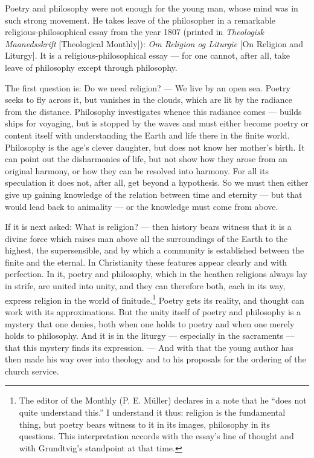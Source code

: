 \documentclass[12pt,a4paper]{book}
\newcommand{\opage}[1]{\marginnote{\footnotesize\textit{[#1]}}}
\begin{document}
Poetry and philosophy were not enough for the young man, whose mind was in such strong
movement. He takes leave of the philosopher in a remarkable religious-philosophical
essay from the year 1807 (printed in \emph{Theologisk Maanedsskrift} [Theological
Monthly]): \emph{Om Religion og Liturgie} [On Religion and Liturgy]. It is a
religious-philosophical essay --- for one cannot, after all, take leave of philosophy
except through philosophy.

The first question is: Do we need religion? --- We live by an open sea. Poetry seeks
to fly across it, but vanishes in the clouds, which are lit by the radiance from the
distance. \opage{59}Philosophy investigates whence this radiance comes --- builds ships for
voyaging, but is stopped by the waves and must either become poetry or content itself
with understanding the Earth and life there in the finite world. Philosophy is the
age's clever daughter, but does not know her mother's birth. It can point out the
disharmonies of life, but not show how they arose from an original harmony, or how
they can be resolved into harmony. For all its speculation it does not, after all, get
beyond a hypothesis. So we must then either give up gaining knowledge of the relation
between time and eternity --- but that would lead back to animality --- or the
knowledge must come from above.

If it is next asked: What is religion? --- then history bears witness that it is a
divine force which raises man above all the surroundings of the Earth to the highest,
the supersensible, and by which a community is established between the finite and the
eternal. In Christianity these features appear clearly and with perfection. In it,
poetry and philosophy, which in the heathen religions always lay in strife, are united
into unity, and they can therefore both, each in its way, express religion in the
world of finitude.\footnote{The editor of the Monthly (P. E. Müller) declares in a
note that he ``does not quite understand this.'' I understand it thus: religion is the
fundamental thing, but poetry bears witness to it in its images, philosophy in its
questions. This interpretation accords with the essay's line of thought and with
Grundtvig's standpoint at that time.} Poetry gets its reality, and thought can work
with its approximations. But the unity itself of poetry and philosophy is a mystery
that one denies, both when one holds to poetry and when one merely holds to
philosophy. And it is in the liturgy --- especially in the sacraments --- that this
mystery finds its expression. --- And with that the young author has then made his
way over into theology and to his proposals for the ordering of the church service.
\end{document}
